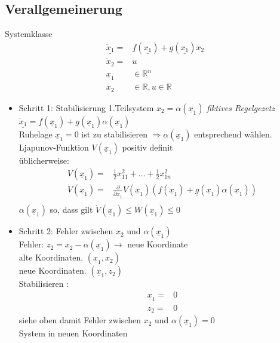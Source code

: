 \documentclass[11pt,a4paper]{article}
\begin{document}
\subsection{Verallgemeinerung}
Systemklasse
\begin{align*}
\underline{\dot x_1} = & \underline{f}(\underline{x_1}) + \underline{g}(\underline{x_1})x_2\\
\dot x_2 = & u\\
\underline x_1 &\in \mathbb{R}^n\\
x_2 &\in \mathbb{R}, u \in \mathbb{R}
\end{align*}
\begin{itemize}
\item Schritt 1: Stabilisierung 1.Teilsystem $x_2 = \alpha(\underline x_1)$ \textit{ fiktives Regelgezetz }\\ $\underline {\dot x_1} = \underline f (\underline x_1) + \underline g(\underline x_1) \alpha (\underline x_1)$ \\
Ruhelage $\underline x_1 = 0 $ ist zu stabilisieren $\Rightarrow \alpha(\underline x_1)$ entsprechend wählen. \\
Ljapunov-Funktion $V(\underline x_1) $ positiv definit \\
üblicherweise: 
\begin{align*}
V(\underline x_1) = &\frac{1}{2} x_{11}^2 + \dots + \frac{1}{2} x_{1n}^2\\
\dot V(\underline x_1) = & \frac{\partial}{\partial \underline x_1} V(\underline x_1) (\underline f(\underline x_1) + \underline g(\underline x_1) \alpha (\underline x_1))\\
\end{align*}
$\alpha(\underline x_1)$ so, dass gilt $\dot V(\underline x_1) \le W(\underline x_1) \le 0$
\item Schritt 2: Fehler zwischen $x_2$ und $\alpha (\underline x_1)$\\
Fehler: $z_2 = x_2 - \alpha (\underline x_1) \rightarrow$ neue Koordinate\\
alte Koordinaten. $(\underline x_1, x_2)$\\
neue Koordinaten. $(\underline x_1, z_2)$\\
Stabilisieren : 
\begin{align*}
\underline x_1 = &0 \\
z_2 = &0
\end{align*} siehe oben damit Fehler zwischen $x_2$ und $\alpha(\underline x_1) = 0$\\
System in neuen Koordinaten\\

\end{itemize}
\end{document}
